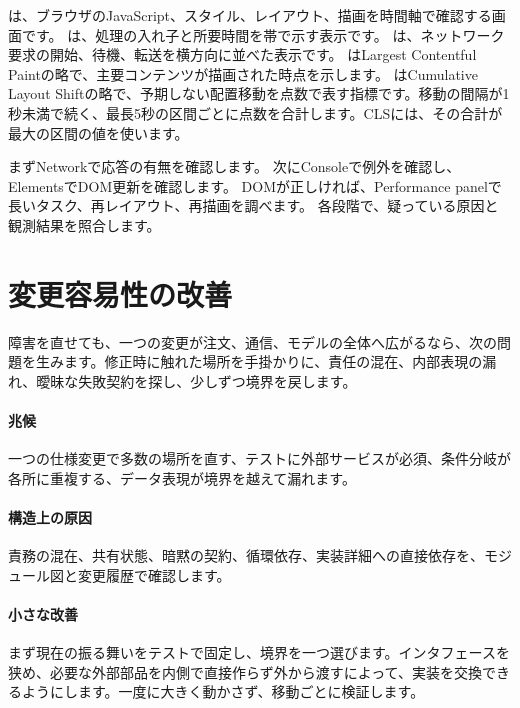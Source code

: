 は、ブラウザのJavaScript、スタイル、レイアウト、描画を時間軸で確認する画面です。
は、処理の入れ子と所要時間を帯で示す表示です。
は、ネットワーク要求の開始、待機、転送を横方向に並べた表示です。
はLargest Contentful Paintの略で、主要コンテンツが描画された時点を示します。
はCumulative Layout Shiftの略で、予期しない配置移動を点数で表す指標です。移動の間隔が1秒未満で続く、最長5秒の区間ごとに点数を合計します。CLSには、その合計が最大の区間の値を使います。

まずNetworkで応答の有無を確認します。
次にConsoleで例外を確認し、ElementsでDOM更新を確認します。
DOMが正しければ、Performance panelで長いタスク、再レイアウト、再描画を調べます。
各段階で、疑っている原因と観測結果を照合します。


\section{変更容易性の改善}
\label{sec:07-practice-11}

障害を直せても、一つの変更が注文、通信、モデルの全体へ広がるなら、次の問題を生みます。修正時に触れた場所を手掛かりに、責任の混在、内部表現の漏れ、曖昧な失敗契約を探し、少しずつ境界を戻します。

\begingroup
\begingroup
\paragraph{兆候}
        一つの仕様変更で多数の場所を直す、テストに外部サービスが必須、条件分岐が各所に重複する、データ表現が境界を越えて漏れます。

\paragraph{構造上の原因}
        責務の混在、共有状態、暗黙の契約、循環依存、実装詳細への直接依存を、モジュール図と変更履歴で確認します。

\par
\endgroup
\medskip
\begingroup
\paragraph{小さな改善}
        まず現在の振る舞いをテストで固定し、境界を一つ選びます。インタフェースを狭め、必要な外部部品を内側で直接作らず外から渡すによって、実装を交換できるようにします。一度に大きく動かさず、移動ごとに検証します。

